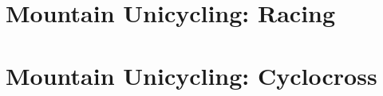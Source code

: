\part{Mountain Unicycling: Racing \label{part:muni}}
\parttoc





\part{Mountain Unicycling: Cyclocross \label{part:muni}}
\parttoc



